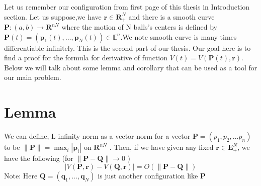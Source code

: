 
Let us remember our configuration from first page of this thesis in Introduction section. Let us suppose,we have  $\mathbf{r} \in \mathbf{R}_{+}^{N}$ and  there is a smooth curve $\mathbf{P}:(a, b) \rightarrow \mathbf{R}^{n N}$ where the motion of N balls's centers  is defined by $\boldsymbol{P}(t)=\left(\boldsymbol{p}_{1}(t), \ldots, \boldsymbol{p}_{N}(t)\right) \in \mathbb{E}^{n}$.We note smooth curve is many times differentiable infinitely. This is the second part of our thesis. Our goal here is to find a proof for the formula for derivative of function   
$V(t)=V(\mathbf{P}(t), \mathbf{r})$. Below we will talk about some lemma and corollary that can be used as a tool for our main problem. 


\section{Lemma} We can define,   L-infinity norm as a vector norm for a vector $\boldsymbol{P}=(p_1,p_2, \dots p_n)$ to be  $\|\mathbf{P}\|=\max _{i}\left|\mathbf{p}_{i}\right|$ on $\mathbf{R}^{n N}$ . Then, if we have given any fixed $\mathbf{r} \in \mathbf{E}_{+}^{N}$, we have the following (for $\|\mathbf{P}-\mathbf{Q}\| \rightarrow 0$ )
 $$
|V(\mathbf{P}, \mathbf{r})-V(\mathbf{Q}, \mathbf{r})|=O(\|\mathbf{P}-\mathbf{Q}\|)
$$
Note: Here $\boldsymbol{Q}=\left(\boldsymbol{q}_{1}, \ldots, \boldsymbol{q}_{N}\right)$  is just another configuration like $\boldsymbol{P}$\\



 












